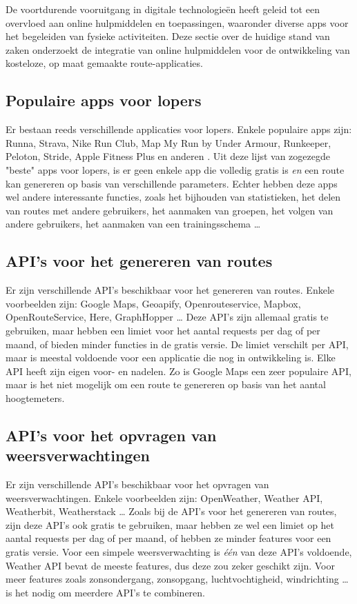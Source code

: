 De voortdurende vooruitgang in digitale technologieën heeft geleid tot een overvloed aan online hulpmiddelen en toepassingen, waaronder diverse apps voor het begeleiden van fysieke activiteiten. 
Deze sectie over de huidige stand van zaken onderzoekt de integratie van online hulpmiddelen voor de ontwikkeling van kosteloze, op maat gemaakte route-applicaties.

\subsection{Populaire apps voor lopers}
Er bestaan reeds verschillende applicaties voor lopers. Enkele populaire apps zijn: Runna, Strava, Nike Run Club, Map My Run by Under Armour, Runkeeper, Peloton, Stride, Apple Fitness Plus en anderen \autocite{Downey2023}.
Uit deze lijst van zogezegde "beste" apps voor lopers, is er geen enkele app die volledig gratis is \emph{en} een route kan genereren op basis van verschillende parameters.
Echter hebben deze apps wel andere interessante functies, zoals het bijhouden van statistieken, het delen van routes met andere gebruikers, het aanmaken van groepen, het volgen van andere gebruikers, het aanmaken van een trainingsschema \ldots


\subsection{API's voor het genereren van routes}
Er zijn verschillende API's beschikbaar voor het genereren van routes. Enkele voorbeelden zijn: Google Maps, Geoapify, Openrouteservice, Mapbox, OpenRouteService, Here, GraphHopper \ldots 
Deze API's zijn allemaal gratis te gebruiken, maar hebben een limiet voor het aantal requests per dag of per maand, of bieden minder functies in de gratis versie. De limiet verschilt per API, maar is meestal voldoende voor een applicatie die nog in ontwikkeling is.
Elke API heeft zijn eigen voor- en nadelen. Zo is Google Maps een zeer populaire API, maar is het niet mogelijk om een route te genereren op basis van het aantal hoogtemeters.

\subsection{API's voor het opvragen van weersverwachtingen}
Er zijn verschillende API's beschikbaar voor het opvragen van weersverwachtingen. Enkele voorbeelden zijn: OpenWeather, Weather API, Weatherbit, Weatherstack \ldots
Zoals bij de API's voor het genereren van routes, zijn deze API's ook gratis te gebruiken, maar hebben ze wel een limiet op het aantal requests per dag of per maand, of hebben ze minder features voor een gratis versie.
Voor een simpele weersverwachting is \emph{één} van deze API's voldoende, Weather API bevat de meeste features, dus deze zou zeker geschikt zijn. Voor meer features zoals zonsondergang, zonsopgang, luchtvochtigheid, windrichting \ldots is het nodig om meerdere API's te combineren.

